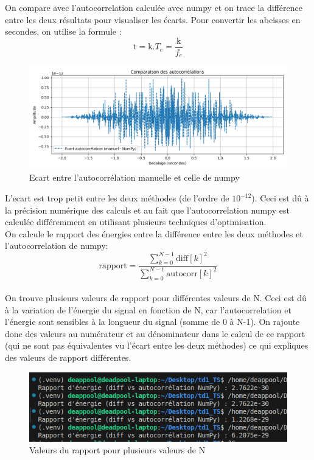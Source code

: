 On compare avec l'autocorrelation calculée avec numpy et on trace la différence entre les deux résultats pour visualiser les écarts.
Pour convertir les abcisses en secondes, on utilise la formule :  
\[ \text{t} = {\text{k}}.{T_e} = \frac{\text{k}}{f_e} \]

\begin{figure}[!h]
\centering
\includegraphics[width=17cm]{screenshots/ecart_autocorrelation.png}
\caption{Ecart entre l'autocorrélation manuelle et celle de numpy}
\end{figure} 

L'ecart est trop petit entre les deux méthodes (de l'ordre de \(10^{-12}\)). Ceci est dû à la précision numérique des calculs et au fait que l'autocorrelation numpy est calculée différemment en utilisant plusieurs techniques d'optimisation.\\

On calcule le rapport des énergies entre la différence entre les deux méthodes et l'autocorrelation de numpy:
\[ \text{rapport} = \frac{\sum_{k=0}^{N-1} \text{diff}[k]^2}{\sum_{k=0}^{N-1} \text{autocorr}[k]^2} \] \\

On trouve plusieurs valeurs de rapport pour différentes valeurs de N. Ceci est dû à la variation de l'énergie du signal en fonction de N, car l'autocorrelation et l'énergie sont sensibles à la longueur du signal (somme de 0 à N-1). On rajoute donc des valeurs au numérateur et au dénominateur dans le calcul de ce rapport (qui ne sont pas équivalentes vu l'écart entre les deux méthodes) ce qui expliques des valeurs de rapport différentes.

\begin{figure}[!h]
\centering
\includegraphics[width=15cm]{screenshots/valeur_rapport.png}
\caption{Valeurs du rapport pour plusieurs valeurs de N}
\end{figure} 

